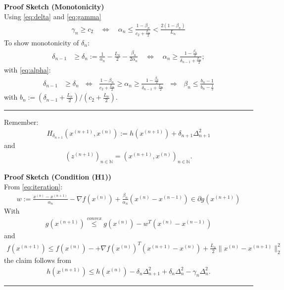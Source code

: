 \documentclass[onecolumn,final,a4paper,13pt,reqno]{siamart}
\begin{document}
	\textbf{Proof Sketch (Monotonicity)}\\
	Using \eqref{eq:delta} and \eqref{eq:gamma}
	\begin{align}
		\gamma_n \geq c_2 \quad\Leftrightarrow\quad \alpha_n \leq \frac{1 - \beta_n}{c_2 + \frac{L_n}{2}} < \frac{2(1 - \beta_n)}{L_n}\label{eq:alpha}
	\end{align}
	To show monotonicity of $\delta_n$:
	\begin{align}
		\delta_{n - 1} &\geq \delta_n := \frac{1}{\alpha_n} - \frac{L_n}{2} - \frac{\beta_n}{2\alpha_n}\quad\Leftrightarrow\quad \alpha_n \geq \frac{1 - \frac{\beta_n}{2}}{\delta_{n - 1} + \frac{L_n}{2}};
	\end{align}
	with \eqref{eq:alpha}:
	\begin{align}
		\delta_{n - 1} &\geq \delta_n \text{ }\Leftrightarrow\text{ } \frac{1 - \beta_n}{c_2 + \frac{L_n}{2}} \geq \alpha_n \geq \frac{1 - \frac{\beta_n}{2}}{\delta_{n - 1} + \frac{L_n}{2}}\text{ }\Rightarrow\text{ } \beta_n \leq \frac{b_n - 1}{b_n - \frac{1}{2}}
	\end{align}
	with $b_n := (\delta_{n - 1} + \frac{L_n}{2})/(c_2 + \frac{L_n}{2})$.

	\noindent\rule{\textwidth}{0.1pt}
	
	Remember:
	\begin{align}
		H_{\delta_{n + 1}}(x^{(n + 1)}, x^{(n)}) := h(x^{(n + 1)}) + \delta_{n + 1}\Delta_{n + 1}^2
	\end{align}
	and
	\begin{align}
		(z^{(n + 1)})_{n \in \mathbb{N}} = (x^{(n + 1)}, x^{(n)})_{n \in \mathbb{N}}.
	\end{align}
	
	\textbf{Proof Sketch (Condition (H1))}\\
	From \eqref{eq:iteration}:
	\begin{align}
		w:= \frac{x^{(n)} - x^{(n + 1)}}{\alpha_n} - \nabla f(x^{(n)}) + \frac{\beta_n}{\alpha_n} (x^{(n)} - x^{(n - 1)}) \in \partial g(x^{(n + 1)}) \label{eq:subdifferential}
	\end{align}
	With
	\begin{align}
		g(x^{(n + 1)}) \overset{convex}{\leq} g(x^{(n)}) - w^T(x^{(n)} - x^{(n - 1)})
	\end{align}
	and
	\begin{align}
		f(x^{(n + 1)}) \leq f(x^{(n)}) - + \nabla f(x^{(n)})^T(x^{(n + 1)} - x^{(n)}) + \frac{L_n}{2}\|x^{(n)} - x^{(n + 1)}\|_2^2
	\end{align}
	the claim follows from
	\begin{align}
		h(x^{(n + 1)}) \leq h(x^{(n)}) - \delta_n\Delta_{n + 1}^2 + \delta_n\Delta_n^2 - \gamma_n \Delta_n^2.
	\end{align}
	\noindent\rule{\textwidth}{0.1pt}
	
\end{document}

